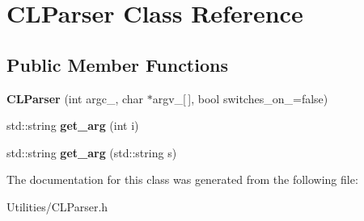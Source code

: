 \hypertarget{classCLParser}{}\section{C\+L\+Parser Class Reference}
\label{classCLParser}
\subsection*{Public Member Functions}
\begin{DoxyCompactItemize}
\item 
{\bfseries C\+L\+Parser} (int argc\+\_\+, char $\ast$argv\+\_\+\mbox{[}$\,$\mbox{]}, bool switches\+\_\+on\+\_\+=false)\hypertarget{classCLParser_a673f3bc8d1f1be44331414a1d6753869}{}\label{classCLParser_a673f3bc8d1f1be44331414a1d6753869}

\item 
std\+::string {\bfseries get\+\_\+arg} (int i)\hypertarget{classCLParser_a4496217c6d3729ca7ebadf313348829e}{}\label{classCLParser_a4496217c6d3729ca7ebadf313348829e}

\item 
std\+::string {\bfseries get\+\_\+arg} (std\+::string s)\hypertarget{classCLParser_a5ad33f45b4ce52c949a087ca3de8873f}{}\label{classCLParser_a5ad33f45b4ce52c949a087ca3de8873f}

\end{DoxyCompactItemize}


The documentation for this class was generated from the following file\+:\begin{DoxyCompactItemize}
\item 
Utilities/C\+L\+Parser.\+h\end{DoxyCompactItemize}
